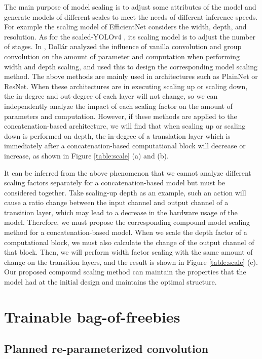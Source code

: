 \documentclass[10pt,twocolumn,letterpaper]{article}
\begin{document}
		The main purpose of model scaling is to adjust some attributes of the model and generate models of different scales to meet the needs of different inference speeds. For example the scaling model of EfficientNet \cite{tan2019efficientnet} considers the width, depth, and resolution. As for the scaled-YOLOv4 \cite{wang2021scaled}, its scaling model is to adjust the number of stages. In \cite{dollar2021fast}, Doll{\'a}r \etal analyzed the influence of vanilla convolution and group convolution on the amount of parameter and computation when performing width and depth scaling, and used this to design the corresponding model scaling method. The above methods are mainly used in architectures such as PlainNet or ResNet. When these architectures are in executing scaling up or scaling down, the in-degree and out-degree of each layer will not change, so we can independently analyze the impact of each scaling factor on the amount of parameters and computation. However, if these methods are applied to the concatenation-based architecture, we will find that when scaling up or scaling down is performed on depth, the in-degree of a translation layer which is immediately after a concatenation-based computational block will decrease or increase, as shown in Figure \ref{table:scale} (a) and (b).
		
		It can be inferred from the above phenomenon that we cannot analyze different scaling factors separately for a concatenation-based model but must be considered together. Take scaling-up depth as an example, such an action will cause a ratio change between the input channel and output channel of a transition layer, which may lead to a decrease in the hardware usage of the model. Therefore, we must propose the corresponding compound model scaling method for a concatenation-based model. When we scale the depth factor of a computational block, we must also calculate the change of the output channel of that block. Then, we will perform width factor scaling with the same amount of change on the transition layers, and the result is shown in Figure \ref{table:scale} (c). Our proposed compound scaling method can maintain the properties that the model had at the initial design and maintains the optimal structure.
		


\section{Trainable bag-of-freebies}
		
		\subsection{Planned re-parameterized convolution}
		
\end{document}
